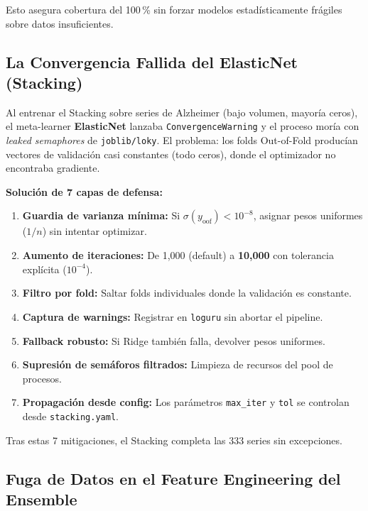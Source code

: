 \documentclass[12pt, letterpaper]{article}
\begin{document}
Esto asegura cobertura del 100\,\% sin forzar modelos estadísticamente frágiles sobre datos insuficientes.

\subsection{La Convergencia Fallida del ElasticNet (Stacking)}\label{subsec:convergence}

\begin{criticalbox}
Al entrenar el Stacking sobre series de Alzheimer (bajo volumen, mayoría ceros), el meta-learner \textbf{ElasticNet} lanzaba \texttt{ConvergenceWarning} y el proceso moría con \textit{leaked semaphores} de \texttt{joblib/loky}. El problema: los folds Out-of-Fold producían vectores de validación casi constantes (todo ceros), donde el optimizador no encontraba gradiente.
\end{criticalbox}

\textbf{Solución de 7 capas de defensa:}
\begin{enumerate}[noitemsep]
    \item \textbf{Guardia de varianza mínima:} Si $\sigma(y_{\text{oof}}) < 10^{-8}$, asignar pesos uniformes ($1/n$) sin intentar optimizar.
    \item \textbf{Aumento de iteraciones:} De 1,000 (default) a \textbf{10,000} con tolerancia explícita ($10^{-4}$).
    \item \textbf{Filtro por fold:} Saltar folds individuales donde la validación es constante.
    \item \textbf{Captura de warnings:} Registrar en \texttt{loguru} sin abortar el pipeline.
    \item \textbf{Fallback robusto:} Si Ridge también falla, devolver pesos uniformes.
    \item \textbf{Supresión de semáforos filtrados:} Limpieza de recursos del pool de procesos.
    \item \textbf{Propagación desde config:} Los parámetros \texttt{max\_iter} y \texttt{tol} se controlan desde \texttt{stacking.yaml}.
\end{enumerate}

Tras estas 7 mitigaciones, el Stacking completa las 333 series sin excepciones.

\subsection{Fuga de Datos en el Feature Engineering del Ensemble}\label{subsec:fuga_features}
\end{document}
